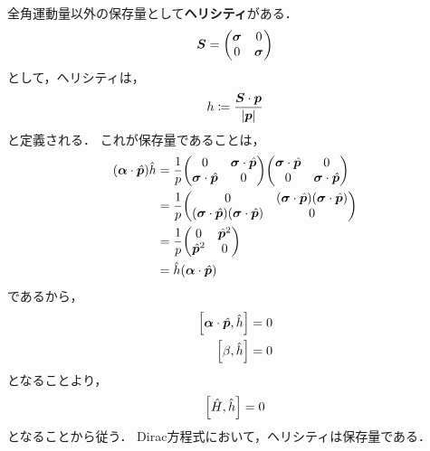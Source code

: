 \documentclass{report}
\begin{document}
  全角運動量以外の保存量として\textbf{ヘリシティ}がある．
  \begin{align}
    \bm{\bm{S}} = 
    \mqty(
      \bm{\sigma} & 0\\
      0 & \bm{\sigma}
    )
  \end{align}
  として，ヘリシティは，
  \begin{align}
    h \coloneqq \frac{\bm{\bm{S}} \cdot \bm{p}}{\abs{\bm{p}}}
  \end{align}
  と定義される．
  これが保存量であることは，
  \begin{align}
    \qty(\bm{\alpha} \cdot \hat{\bm{p}}) \hat{h} 
    &= \frac{1}{p}\mqty(
      0 & \bm{\sigma} \cdot \hat{\bm{p}}\\
      \bm{\sigma} \cdot \hat{\bm{p}} & 0
    )\mqty(
      \bm{\sigma} \cdot \hat{\bm{p}} & 0\\
      0 & \bm{\sigma} \cdot \hat{\bm{p}}
    ) \\
    &= \frac{1}{p}\mqty(
      0 & (\bm{\sigma} \cdot \hat{\bm{p}})(\bm{\sigma} \cdot \hat{\bm{p}})\\
      (\bm{\sigma} \cdot \hat{\bm{p}})(\bm{\sigma} \cdot \hat{\bm{p}}) & 0
    ) \\
    &= \frac{1}{p}\mqty(
      0 & \hat{\bm{p}}^2\\
      \hat{\bm{p}}^2 & 0
    ) \\
    &= \hat{h}(\bm{\alpha}\cdot \hat{\bm{p}})
  \end{align}
  であるから，
  \begin{align}
    \qty[\bm{\alpha} \cdot \hat{\bm{p}}, \hat{h}] = 0\\
    \qty[\beta, \hat{h}] = 0
  \end{align}
  となることより，
  \begin{align}
    \qty[\hat{H}, \hat{h}] = 0
  \end{align}
  となることから従う．
  Dirac方程式において，ヘリシティは保存量である．
\end{document}
